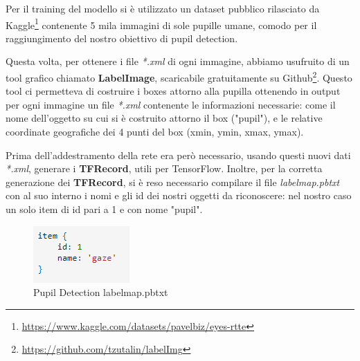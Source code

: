 Per il training del modello si è utilizzato un dataset pubblico rilasciato da Kaggle\footnote{\url{https://www.kaggle.com/datasets/pavelbiz/eyes-rtte}} contenente 5 mila immagini di sole pupille umane, comodo per il raggiungimento del nostro obiettivo di pupil detection.

Questa volta, per ottenere i file \textit{*.xml} di ogni immagine, abbiamo usufruito di un tool grafico chiamato \textbf{LabelImage}, scaricabile gratuitamente su Github\footnote{\url{https://github.com/tzutalin/labelImg}}. Questo tool ci permetteva di costruire i boxes attorno alla pupilla ottenendo in output per ogni immagine un file \textit{*.xml} contenente le informazioni necessarie: come il nome dell'oggetto su cui si è costruito attorno il box ("pupil"), e le relative coordinate geografiche dei 4 punti del box (xmin, ymin, xmax, ymax).

Prima dell'addestramento della rete era però necessario, usando questi nuovi dati \textit{*.xml}, generare i \textbf{TFRecord}, utili per TensorFlow.
Inoltre, per la corretta generazione dei \textbf{TFRecord}, si è reso necessario compilare il file \textit{labelmap.pbtxt} con al suo interno i nomi e gli id dei nostri oggetti da riconoscere: nel nostro caso un solo item di id pari a 1 e con nome "pupil".

\begin{figure}[htbp]
    \centering
    \includegraphics[scale=1]{ReteNeurale/PupilDetection/Dataset/Images/pupillabelmap_item.png}
    \caption{Pupil Detection labelmap.pbtxt}
    \label{fig:pupillabelmap}
\end{figure}
